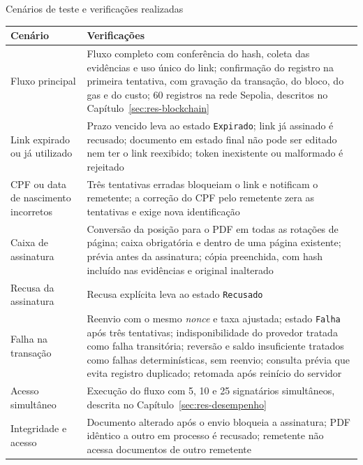 \documentclass[
    12pt,
    a4paper,
    oneside,
    chapter=TITLE,
    section=TITLE,
    subsection=TITLE,
    subsubsection=TITLE,
    sumario=tradicional,
    english,
    brazil
]{abntex2}
\newcommand{\elem}[1]{\texttt{#1}}
\begin{document}
\begin{quadro}[htb]
    \caption{Cenários de teste e verificações realizadas}
    \label{quadro:cenarios}
    \centering
    \small
    \begin{tabular}{L{4.0cm}L{10.8cm}}
        \toprule
        \textbf{Cenário} & \textbf{Verificações} \\
        \midrule
        Fluxo principal & Fluxo completo com conferência do hash, coleta das evidências e uso único do link; confirmação do registro na primeira tentativa, com gravação da transação, do bloco, do gas e do custo; 60 registros na rede Sepolia, descritos no Capítulo~\ref{sec:res-blockchain} \\
        Link expirado ou já utilizado & Prazo vencido leva ao estado \elem{Expirado}; link já assinado é recusado; documento em estado final não pode ser editado nem ter o link reexibido; token inexistente ou malformado é rejeitado \\
        CPF ou data de nascimento incorretos & Três tentativas erradas bloqueiam o link e notificam o remetente; a correção do CPF pelo remetente zera as tentativas e exige nova identificação \\
        Caixa de assinatura & Conversão da posição para o PDF em todas as rotações de página; caixa obrigatória e dentro de uma página existente; prévia antes da assinatura; cópia preenchida, com hash incluído nas evidências e original inalterado \\
        Recusa da assinatura & Recusa explícita leva ao estado \elem{Recusado} \\
        Falha na transação & Reenvio com o mesmo \emph{nonce} e taxa ajustada; estado \elem{Falha} após três tentativas; indisponibilidade do provedor tratada como falha transitória; reversão e saldo insuficiente tratados como falhas determinísticas, sem reenvio; consulta prévia que evita registro duplicado; retomada após reinício do servidor \\
        Acesso simultâneo & Execução do fluxo com 5, 10 e 25 signatários simultâneos, descrita no Capítulo~\ref{sec:res-desempenho} \\
        Integridade e acesso & Documento alterado após o envio bloqueia a assinatura; PDF idêntico a outro em processo é recusado; remetente não acessa documentos de outro remetente \\
        \bottomrule
    \end{tabular}
\end{quadro}
\end{document}
